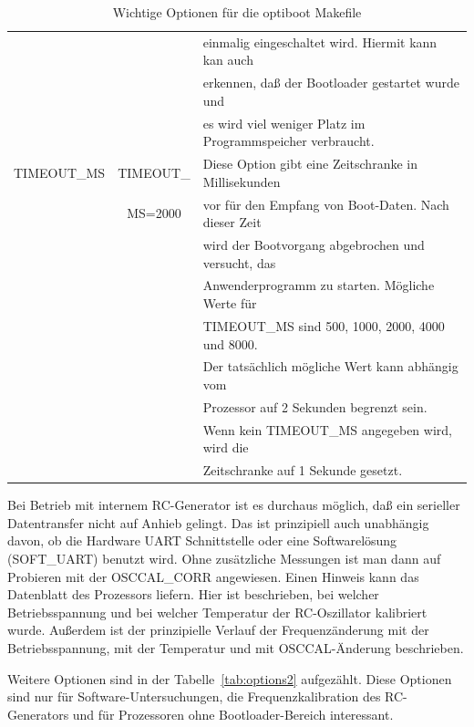 \begin{table}[H]
\begin{center}
\begin{tabular}{| c | c | l |}
		   &                & einmalig eingeschaltet wird. Hiermit kann kan auch \\
		   &                & erkennen, daß der Bootloader gestartet wurde und \\
		   &                & es wird viel weniger Platz im Programmspeicher verbraucht. \\
    \hline
 TIMEOUT\_MS       & TIMEOUT\_      & Diese Option gibt eine Zeitschranke in Millisekunden \\
                   &  MS=2000       & vor für den Empfang von Boot-Daten. Nach dieser Zeit\\
                   &                & wird der Bootvorgang abgebrochen und versucht, das \\
                   &                & Anwenderprogramm zu starten. Mögliche Werte für \\
                   &                & TIMEOUT\_MS sind 500, 1000, 2000, 4000 und 8000. \\
                   &                & Der tatsächlich mögliche Wert kann abhängig vom \\
                   &                & Prozessor auf 2 Sekunden begrenzt sein. \\
                   &                & Wenn kein TIMEOUT\_MS angegeben wird, wird die \\
                   &                & Zeitschranke auf 1 Sekunde gesetzt. \\
    \hline
    \end{tabular}
  \end{center}
  \caption{Wichtige Optionen für die optiboot Makefile}
  \label{tab:options1}
\end{table}

Bei Betrieb mit internem RC-Generator ist es durchaus möglich, daß ein serieller Datentransfer
nicht auf Anhieb gelingt. Das ist prinzipiell auch unabhängig davon, ob die Hardware UART
Schnittstelle oder eine Softwarelösung (SOFT\_UART) benutzt wird. Ohne zusätzliche Messungen
ist man dann auf Probieren mit der OSCCAL\_CORR angewiesen. Einen Hinweis kann
das Datenblatt des Prozessors liefern. Hier ist beschrieben, bei welcher Betriebsspannung
und bei welcher Temperatur der RC-Oszillator kalibriert wurde. Außerdem ist der
prinzipielle Verlauf der Frequenzänderung mit der Betriebsspannung, mit der Temperatur und
mit OSCCAL-Änderung beschrieben. 


Weitere Optionen sind in der Tabelle~\ref{tab:options2} aufgezählt. 
Diese Optionen sind nur für Software-Untersuchungen, die Frequenzkalibration des RC-Generators
 und für Prozessoren ohne Bootloader-Bereich interessant.

